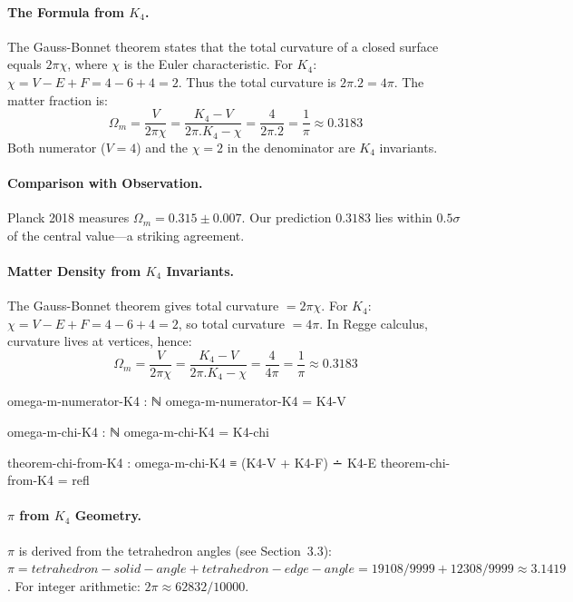 \documentclass[11pt,a4paper]{book}
\def\cdot{.}%
\def\text#1{#1}%
\begin{document}
\paragraph{The Formula from $K_4$.}
The Gauss-Bonnet theorem states that the total curvature of a closed surface equals $2\pi\chi$,
where $\chi$ is the Euler characteristic. For $K_4$: $\chi = V - E + F = 4 - 6 + 4 = 2$.
Thus the total curvature is $2\pi \cdot 2 = 4\pi$. The matter fraction is:
\[
\Omega_m = \frac{V}{2\pi\chi} = \frac{K_4\text{-}V}{2\pi \cdot K_4\text{-}\chi} = \frac{4}{2\pi \cdot 2} = \frac{1}{\pi} \approx 0.3183
\]
Both numerator ($V=4$) and the $\chi=2$ in the denominator are $K_4$ invariants.

\paragraph{Comparison with Observation.}
Planck 2018 measures $\Omega_m = 0.315 \pm 0.007$. Our prediction $0.3183$ lies 
within $0.5\sigma$ of the central value---a striking agreement.

\paragraph{Matter Density from $K_4$ Invariants.}
The Gauss-Bonnet theorem gives total curvature $= 2\pi\chi$.
For $K_4$: $\chi = V - E + F = 4 - 6 + 4 = 2$, so total curvature $= 4\pi$.
In Regge calculus, curvature lives at vertices, hence:
\[
\Omega_m = \frac{V}{2\pi\chi} = \frac{K_4\text{-}V}{2\pi \cdot K_4\text{-}\chi} = \frac{4}{4\pi} = \frac{1}{\pi} \approx 0.3183
\]

\begin{code}
omega-m-numerator-K4 : ℕ
omega-m-numerator-K4 = K4-V

omega-m-chi-K4 : ℕ
omega-m-chi-K4 = K4-chi

theorem-chi-from-K4 : omega-m-chi-K4 ≡ (K4-V + K4-F) ∸ K4-E
theorem-chi-from-K4 = refl

\end{code}

\paragraph{$\pi$ from $K_4$ Geometry.}
$\pi$ is derived from the tetrahedron angles (see Section~3.3):
$\pi = \text{tetrahedron-solid-angle} + \text{tetrahedron-edge-angle} = 19108/9999 + 12308/9999 \approx 3.1419$.
For integer arithmetic: $2\pi \approx 62832/10000$.
\end{document}
